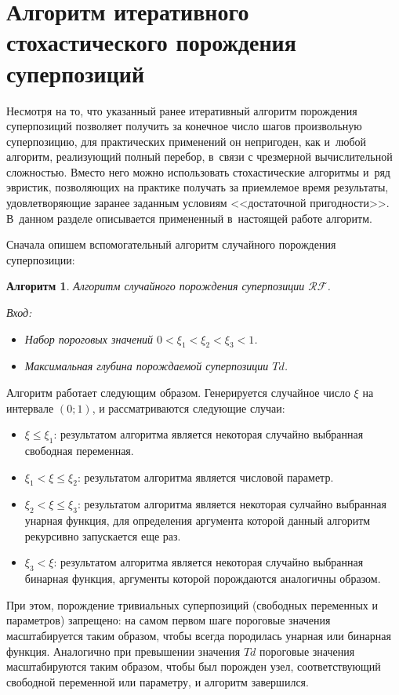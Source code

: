 \documentclass[12pt,a4paper]{amsart}
\newtheorem{algo}{Алгоритм}
\begin{document}
\section{Алгоритм итеративного стохастического порождения суперпозиций}

Несмотря на то, что указанный ранее итеративный алгоритм порождения
суперпозиций позволяет получить за конечное число шагов произвольную
суперпозицию, для практических применений он непригоден, как и~любой алгоритм,
реализующий полный перебор, в~связи с чрезмерной вычислительной сложностью.
Вместо него можно использовать стохастические алгоритмы и~ряд эвристик,
позволяющих на практике получать за приемлемое время результаты,
удовлетворяющие заранее заданным условиям <<достаточной пригодности>>.
В~данном разделе описывается примененный в~настоящей работе алгоритм.

Сначала опишем вспомогательный алгоритм случайного порождения суперпозиции:

\begin{algo}
  \label{algo:RF}
  Алгоритм случайного порождения суперпозиции $\mathcal{RF}$.

  Вход:
  \begin{itemize}
	\item Набор пороговых значений $0 < \xi_1 < \xi_2 < \xi_3 < 1$.
	\item Максимальная глубина порождаемой суперпозиции $Td$.
  \end{itemize}
\end{algo}

Алгоритм работает следующим образом. Генерируется случайное число $\xi$ на
интервале $(0; 1)$, и рассматриваются следующие случаи:
\begin{itemize}
  \item $\xi \leq \xi_1$: результатом алгоритма является некоторая случайно
	выбранная свободная переменная.
  \item $\xi_1 < \xi \leq \xi_2$: результатом алгоритма является	числовой
	параметр.
  \item $\xi_2 < \xi \leq \xi_3$: результатом алгоритма является некоторая
	сулчайно выбранная унарная функция, для определения аргумента которой
	данный алгоритм рекурсивно запускается еще раз.
  \item $\xi_3 < \xi$: результатом алгоритма является некоторая случайно
	выбранная бинарная функция, аргументы которой порождаются аналогичны
	образом.
\end{itemize}

При этом, порождение тривиальных суперпозиций (свободных переменных и
параметров) запрещено: на самом первом шаге пороговые значения масштабируется
таким образом, чтобы всегда породилась унарная или бинарная функция.
Аналогично при превышении значения $Td$ пороговые значения масштабируются
таким образом, чтобы был порожден узел, соответствующий свободной переменной
или параметру, и алгоритм завершился.
\end{document}

